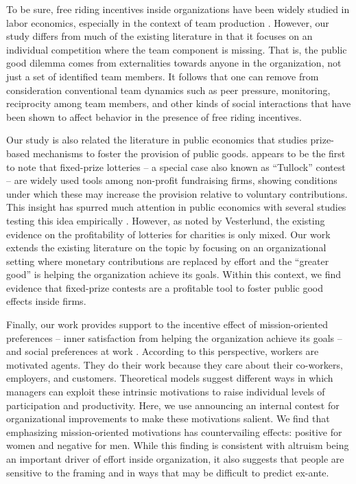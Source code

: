 \documentclass[11pt, titlepage]{article}
\begin{document}
To be sure, free riding incentives inside organizations have been widely
studied in labor economics, especially in the context of team production
\citep{erev1993constructive, hamilton2003team, boning2007opportunity, gibbs2014field}.
However, our study differs from much of the existing literature in that
it focuses on an individual competition where the team component is
missing. That is, the public good dilemma comes from externalities
towards anyone in the organization, not just a set of identified team
members. It follows that one can remove from consideration conventional
team dynamics such as peer pressure, monitoring, reciprocity among team
members, and other kinds of social interactions that have been shown to
affect behavior in the presence of free riding incentives.

Our study is also related the literature in public economics that
studies prize-based mechanisms to foster the provision of public goods.
\citet{morgan2000funding} appears to be the first to note that
fixed-prize lotteries -- a special case also known as ``Tullock''
contest -- are widely used tools among non-profit fundraising firms,
showing conditions under which these may increase the provision relative
to voluntary contributions. This insight has spurred much attention in
public economics with several studies testing this idea empirically
\citep[see][ for a survey]{vesterlund2012voluntary}. However, as noted
by Vesterlund, the existing evidence on the profitability of lotteries
for charities is only mixed. Our work extends the existing literature on
the topic by focusing on an organizational setting where monetary
contributions are replaced by effort and the ``greater good'' is helping
the organization achieve its goals. Within this context, we find
evidence that fixed-prize contests are a profitable tool to foster
public good effects inside firms.

Finally, our work provides support to the incentive effect of
mission-oriented preferences -- inner satisfaction from helping the
organization achieve its goals --
\citep{akerlof2005identity, besley2005competition, delfgaauw2005dedicated, delfgaauw2008incentives, prendergast2007motivation, rotemberg2006altruism}
and social preferences at work
\citep{bandiera2005social, bandiera2008social, bandiera2013team, dellavigna2016estimating}.
According to this perspective, workers are motivated agents. They do
their work because they care about their co-workers, employers, and
customers. Theoretical models suggest different ways in which managers
can exploit these intrinsic motivations to raise individual levels of
participation and productivity. Here, we use announcing an internal
contest for organizational improvements to make these motivations
salient. We find that emphasizing mission-oriented motivations has
countervailing effects: positive for women and negative for men. While
this finding is consistent with altruism being an important driver of
effort inside organization, it also suggests that people are sensitive
to the framing and in ways that may be difficult to predict ex-ante.
\end{document}
